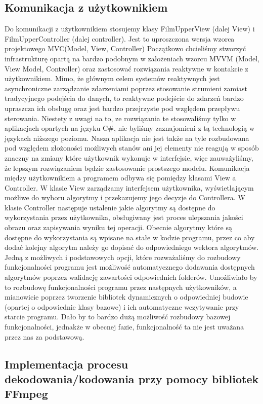 \documentclass[twoside]{projektInzynierskiMS}
\begin{document}
\subsection{Komunikacja z użytkownikiem}
Do komunikacji z użytkownikiem stosujemy klasy FilmUpperView (dalej View) i FilmUpperController (dalej controller). Jest to uproszczona wersja wzorca projektowego MVC(Model, View, Controller) Początkowo chcieliśmy  stworzyć infrastrukturę opartą na bardzo podobnym w założeniach wzorcu MVVM (Model, View Model, Controller) oraz zastosować rozwiązania reaktywne w kontakcie z użytkownikiem. Mimo, że głównym celem systemów reaktywnych jest asynchroniczne zarządzanie zdarzeniami poprzez stosowanie strumieni zamiast tradycyjnego podejścia do danych, to reaktywne podejście do zdarzeń bardzo upraszcza ich obsługę oraz jest bardzo przejrzyste pod względem przepływu sterowania. Niestety z uwagi na to, ze rozwiązania te stosowaliśmy tylko w aplikacjach opartych na języku C\#, nie byliśmy zaznajomieni z tą technologią w językach niższego poziomu. Nasza aplikacja nie jest także na tyle rozbudowana pod względem złożoności możliwych stanów ani jej elementy nie reagują w sposób znaczny na zmiany które użytkownik wykonuje w interfejsie, więc zauważyliśmy, że lepszym rozwiązaniem będzie zastosowanie prostszego modelu. Komunikacja między użytkownikiem a programem odbywa się pomiędzy klasami View a Controller. W klasie View zarządzamy interfejsem użytkownika, wyświetlającym możliwe do wyboru algorytmy i przekazujemy jego decyzje do Controllera. W klasie Controller następuje ustalenie jakie algorytmy są dostępne do wykorzystania przez użytkownika, obsługiwany jest proces ulepszania jakości obrazu oraz zapisywania wyniku tej operacji. Obecnie algorytmy które są dostępne do wykorzystania są wpisane na stałe w kodzie programu, przez co aby dodać kolejny algorytm należy go dopisać do odpowiedniego wektora algorytmów. Jedną z możliwych i podstawowych opcji, które rozważaliśmy do rozbudowy funkcjonalności programu jest możliwość automatycznego dodawania dostępnych algorytmów poprzez walidację zawartości odpowiednich folderów. Umożliwiało by to rozbudowę funkcjonalności programu przez następnych użytkowników, a mianowicie poprzez tworzenie bibliotek dynamicznych o odpowiedniej budowie (opartej o odpowiednie klasy bazowe) i ich automatyczne wczytywanie przy starcie programu. Dało by to bardzo dużą możliwość rozbudowy bazowej funkcjonalności, jednakże w obecnej fazie, funkcjonalność ta nie jest uważana przez nas za podstawową.

\subsection{Implementacja procesu dekodowania/kodowania przy pomocy bibliotek FFmpeg}
\end{document}
